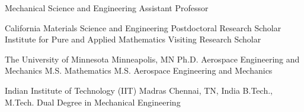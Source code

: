 \documentclass[numbers]{cv}
\begin{document}

\begin{employment}
  {}
  {
    {Mechanical Science and Engineering}
    {Assistant Professor}
    {}
    {}
  }

  {California}
  {
    {Materials Science and Engineering}
    {Postdoctoral Research Scholar}%
    {
    }
    {
    }
    {Institute for Pure and Applied Mathematics}
    {Visiting Research Scholar}
    {}
    {}
}
\end{employment}

\begin{education}
  {The University of Minnesota}%
  {Minneapolis, MN}%
  {%
    {Ph.D.}%
    {}
    {Aerospace Engineering and Mechanics}%
    {}
    {M.S.}%
    {}
    {Mathematics}%
    {%
    }%
    {M.S.}%
    {}
    {Aerospace Engineering and Mechanics}%
    {}
  }

  {Indian Institute of Technology (IIT) Madras}%
  {Chennai, TN, India}%
  {%
    {B.Tech., M.Tech.}%
    {}
    {Dual Degree in Mechanical Engineering}%
    {}
  }

\end{education}
\end{document}
